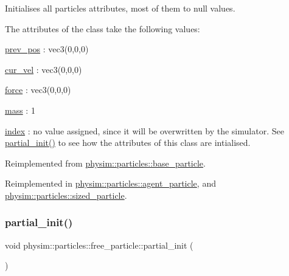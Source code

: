 Initialises all particle\textquotesingle{}s attributes, most of them to null values. 

The attributes of the class take the following values\+:
\begin{DoxyItemize}
\item \hyperlink{classphysim_1_1particles_1_1base__particle_a08072db6a1a59d21acc9cac6ac8965f7}{prev\+\_\+pos} \+: vec3(0,0,0)
\item \hyperlink{classphysim_1_1particles_1_1base__particle_a66a164d2a130c40901e3ec2709cdad43}{cur\+\_\+vel} \+: vec3(0,0,0)
\item \hyperlink{classphysim_1_1particles_1_1base__particle_adc3b11899d2e50970ae5d4931721a0ef}{force} \+: vec3(0,0,0)
\item \hyperlink{classphysim_1_1particles_1_1base__particle_acb5c9f0b4a911d8981210e2cfc4dda8a}{mass} \+: 1
\item \hyperlink{classphysim_1_1particles_1_1base__particle_a44f5de3bb4b860dfd511e28e1d6519d5}{index} \+: no value assigned, since it will be overwritten by the simulator. See \hyperlink{classphysim_1_1particles_1_1free__particle_a967f3229ac014999de8f9823882c60e8}{partial\+\_\+init()} to see how the attributes of this class are intialised. 
\end{DoxyItemize}

Reimplemented from \hyperlink{classphysim_1_1particles_1_1base__particle_a3bba517d51fd0bff7ec583e701765f87}{physim\+::particles\+::base\+\_\+particle}.



Reimplemented in \hyperlink{classphysim_1_1particles_1_1agent__particle_ac13082909f480fc55d406321c77d38b1}{physim\+::particles\+::agent\+\_\+particle}, and \hyperlink{classphysim_1_1particles_1_1sized__particle_a63de84961417c1522c0ca576697cd972}{physim\+::particles\+::sized\+\_\+particle}.

\mbox{\label{classphysim_1_1particles_1_1free__particle_a967f3229ac014999de8f9823882c60e8}} 
\subsubsection{\texorpdfstring{partial\+\_\+init()}{partial\_init()}}
{\footnotesize\ttfamily void physim\+::particles\+::free\+\_\+particle\+::partial\+\_\+init (\begin{DoxyParamCaption}{ }\end{DoxyParamCaption})\hspace{0.3cm}{\ttfamily [private]}}



